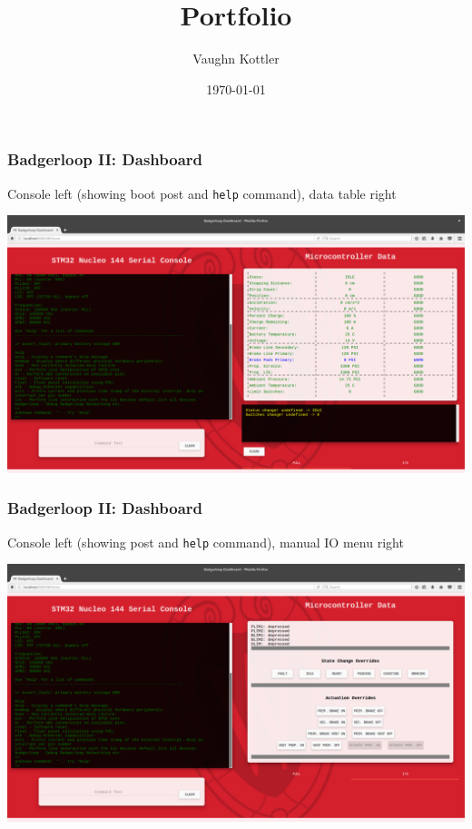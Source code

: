 \documentclass{beamer}
\title{Portfolio}
\author{Vaughn Kottler}
\date{\today}
\begin{document}
\begin{frame}
\frametitle{Badgerloop II: Dashboard}
    Console left (showing boot post and \texttt{help} command), data table right
\begin{center}
    \includegraphics[width=\linewidth]{assets/badgerloop_2/Dashboard/dash_live1}
\end{center}
\end{frame}

\begin{frame}
\frametitle{Badgerloop II: Dashboard}
    Console left (showing post and \texttt{help} command), manual IO menu right
\begin{center}
    \includegraphics[width=\linewidth]{assets/badgerloop_2/Dashboard/dash_live2}
\end{center}
\end{frame}
\end{document}
